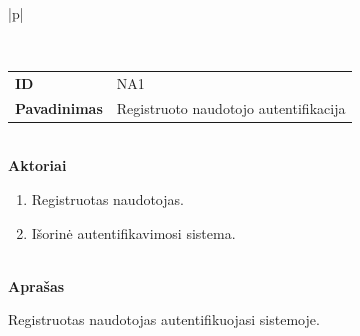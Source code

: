 \begin{center}
    \begin{longtable}{|p{\textwidth}|}
    \caption{Tekstinio naudojimo atvejo pavyzdys}
	\label{tab:text_use_cases_login}
	\\ \hline 
    \begin{tabular}{@{}p{3.5cm}p{12cm}}
    	\\ 
    	\textbf{ID} & NA1
    	\\ 
    	\textbf{Pavadinimas} & Registruoto naudotojo autentifikacija
    	\\ 
    \end{tabular}
    \\
    \textbf{Aktoriai}
    \begin{enumerate}
    	\item Registruotas naudotojas.
    	\item Išorinė autentifikavimosi sistema.
	\end{enumerate} 
    \\
    \textbf{Aprašas}
    
    Registruotas naudotojas autentifikuojasi sistemoje. 
    

\end{longtable}
\end{center}
